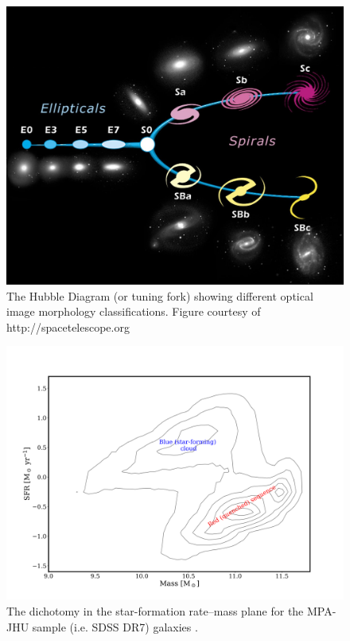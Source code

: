 \begin{figure}
	\centering
	\includegraphics[width=\textwidth]{introduction/hubble.jpg}
	\caption[The Hubble tuning-fork]{The Hubble Diagram (or tuning fork) showing different optical image morphology classifications. Figure courtesy of http://spacetelescope.org}
	\label{fig:introHubble}
\end{figure}

\begin{figure}
	\centering
	\includegraphics[width=\textwidth]{introduction/sfMass.png}
	\caption[Star-formation rate--Mass diagram]{The dichotomy in the star-formation rate--mass plane for the MPA-JHU sample (i.e. SDSS DR7) galaxies \citep{Kauffmann2003, Brinchmann2003, Salim2007}.}
	\label{fig:colorMass}
\end{figure}

